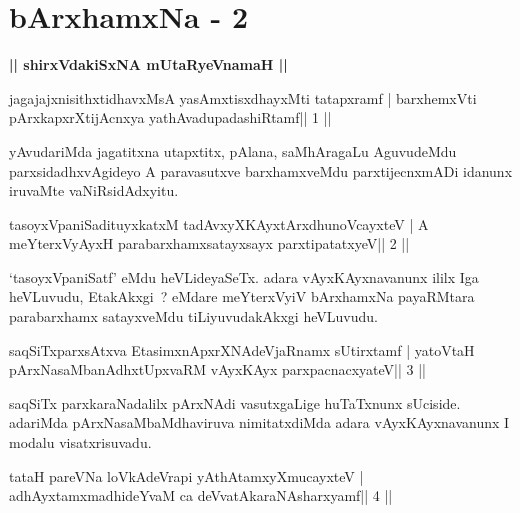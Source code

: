 \chapter{bArxhamxNa - 2}

\begin{center}
{\large{\textbf{|| shirxVdakiSxNA mUtaRyeVnamaH ||}}}
\end{center}

\begin{shl}
jagajajxnisithxtidhavxMsA yasAmxtisxdhayxMti tatapxramf |
barxhemxVti pArxkapxrXtijAcnxya yathAvadupadashiRtamf\hfill || 1 ||
\end{shl}

\begin{artha}
yAvudariMda jagatitxna utapxtitx, pAlana, saMhAragaLu AguvudeMdu
parxsidadhxvAgideyo A paravasutxve barxhamxveMdu parxtijecnxmADi
idanunx iruvaMte vaNiRsidAdxyitu.
\end{artha}

\begin{shl}
tasoyxVpaniSadituyxkatxM tadAvxyXKAyx\s tArxdhunoVcayxteV |
A meYterxVyAyxH parabarxhamxsatayxsayx parxtipatatxyeV\hfill || 2 ||
\end{shl}

\begin{artha}
`tasoyxVpaniSatf' eMdu heVLideyaSeTx. adara vAyxKAyxnavanunx ililx Iga   heVLuvudu, EtakAkxgi~? eMdare meYterxVyiV bArxhamxNa payaRMtara   parabarxhamx satayxveMdu tiLiyuvudakAkxgi heVLuvudu.
\end{artha}




\begin{shl}
saqSiTxparxsAtxva EtasimxnApxrXNAdeVjaRnamx sUtirxtamf |
yatoV\s taH pArxNasaMbanAdhxtUpxvaRM vAyxKAyx parxpacnacxyateV\hfill || 3 ||
\end{shl}

\begin{artha}
saqSiTx parxkaraNadalilx pArxNAdi vasutxgaLige huTaTxnunx sUciside. adariMda pArxNasaMbaMdhaviruva nimitatxdiMda adara vAyxKAyxnavanunx I modalu visatxrisuvadu.
\end{artha}

\begin{shl}
tataH pareVNa loVkAdeVrapi yAthAtamxyXmucayxteV |
adhAyxtamxmadhideYvaM ca deVvatAkaraNAsharxyamf\hfill || 4 ||
\end{shl}

